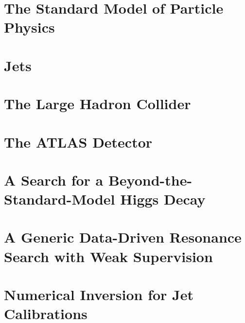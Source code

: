 \documentclass[12pt]{report}
\begin{document}

\chapter{The Standard Model of Particle Physics}
\label{ch:SM}

\chapter{Jets}
\label{ch:Jets}%

\chapter{The Large Hadron Collider}
\label{ch:LHC}%

\chapter{The ATLAS Detector}
\label{ch:ATLAS}%


\chapter{A Search for a Beyond-the-Standard-Model Higgs Decay}
\label{ch:HBSM}%

\chapter{A Generic Data-Driven Resonance Search with Weak Supervision}
\label{ch:CWoLa}%

\chapter{Numerical Inversion for Jet Calibrations}
\label{ch:NI}%
\end{document}
